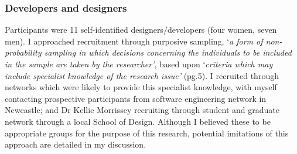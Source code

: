 \subsubsection{Developers and designers}
Participants were 11 self-identified designers/developers (four women, seven men). I approached recruitment through purposive sampling, ‘\textit{a form of non-probability sampling in which decisions concerning the individuals to be included in the sample are taken by the researcher’}, based upon ‘\textit{criteria which may include specialist knowledge of the research issue’ }(pg.5)\citep{rai2015study}. I recruited through networks which were likely to provide this specialist knowledge, with myself contacting prospective participants from software engineering network in Newcastle; and Dr Kellie Morrissey recruiting through student and graduate network through a local School of Design. Although I believed these to be appropriate groups for the purpose of this research, potential imitations of this approach are detailed in my discussion. 



\renewcommand{\arraystretch}{1.4}

